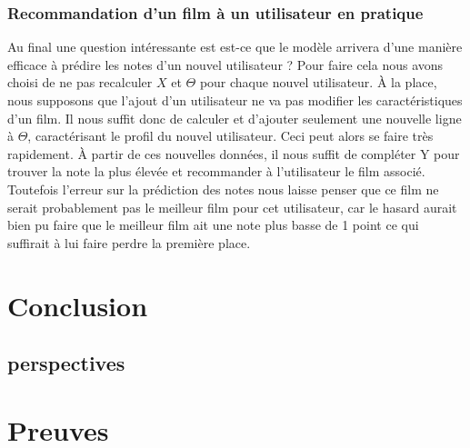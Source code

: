 \documentclass[a4paper,10pt]{article}
\begin{document}
\subsubsection{Recommandation d'un film à un utilisateur en pratique}
Au final une question intéressante est est-ce que le modèle arrivera d'une manière efficace à prédire les notes d'un nouvel utilisateur ? Pour faire cela nous avons
choisi de ne pas recalculer $X$ et $\Theta$ pour chaque nouvel utilisateur. À la place, nous supposons que l'ajout d'un utilisateur ne va pas modifier
les caractéristiques d'un film. Il nous suffit donc de calculer et d'ajouter seulement une nouvelle ligne à $\Theta$, caractérisant le profil du nouvel utilisateur. Ceci peut alors se faire très rapidement. À partir de ces nouvelles données, il nous suffit de compléter Y pour trouver la note la plus élevée et recommander à l'utilisateur le film associé. 
Toutefois l'erreur sur la prédiction des notes nous laisse penser que ce film ne serait probablement pas le meilleur film pour cet utilisateur, car le hasard aurait bien pu faire que le meilleur film ait une note plus basse de 1 point ce qui suffirait à lui faire perdre la première place.

\section{Conclusion}

\subsection{perspectives}
\appendix  
\section{Preuves}  
\end{document}
